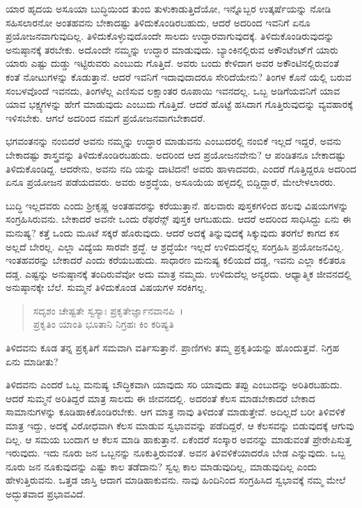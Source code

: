 ಯಾರ ಹೃದಯ ಅಸೂಯಾ ಬುದ್ಧಿಯಿಂದ ತುಂಬಿ ತುಳುಕಾಡುತ್ತಿದೆಯೋ, ಇನ್ನೊಬ್ಬರ ಉತ್ಕರ್ಷೆಯನ್ನು ನೋಡಿ ಸಹಿಸಲಾರನೋ ಅಂತಹವನು ಬೇಕಾದಷ್ಟು ತಿಳಿದುಕೊಂಡಿರಬಹುದು, ಆದರೆ ಅದರಿಂದ ಇವನಿಗೆ ಏನೂ ಪ್ರಯೋಜನವಾಗುವುದಿಲ್ಲ. ತಿಳಿದುಕೊಳ್ಳುವುದೊಂದೇ ಸಾಲದು ಉದ್ಧಾರವಾಗುವುದಕ್ಕೆ. ತಿಳಿದುಕೊಂಡಿರುವುದನ್ನು ಅನುಷ್ಠಾನಕ್ಕೆ ತರಬೇಕು. ಅದೊಂದೇ ನಮ್ಮನ್ನು ಉದ್ಧಾರ ಮಾಡುವುದು. ಬ್ಯಾಂಕಿನಲ್ಲಿರುವ ಅಕೌಂಟೆಂಟ್​ಗೆ ಯಾರು ಯಾರು ಎಷ್ಟು ದುಡ್ಡು ಇಟ್ಟಿರುವರು ಎಂಬುದು ಗೊತ್ತಿದೆ. ಅವರು ಬಂದು ಕೇಳಿದಾಗ ಅವರ ಅಕೌಂಟಿನಲ್ಲಿರುವಂತೆ ಕಂತೆ ನೋಟುಗಳನ್ನು ಕೊಡುತ್ತಾನೆ. ಆದರೆ ಇವನಿಗೆ ಇದಾವುದಾದರೂ ಸೇರಿದೆಯೇನು? ತಿಂಗಳ ಕೊನೆ ಯಲ್ಲಿ ಬರುವ ಸಂಬಳವೊಂದೆ ಇವನದು, ತಿಂಗಳೆಲ್ಲ ಎಣಿಸುವ ಲಕ್ಷಾಂತರ ರೂಪಾಯಿ ಇವನದಲ್ಲ. ಒಬ್ಬ ಅಡಿಗೆಯವನಿಗೆ ಯಾವ ಯಾವ ಭಕ್ಷ್ಯಗಳನ್ನು ಹೇಗೆ ಮಾಡುವುದು ಎಂಬುದು ಗೊತ್ತಿದೆ. ಆದರೆ ಹೊಟ್ಟೆ ಹಸಿದಾಗ ಗೊತ್ತಿರುವುದನ್ನು ವ್ಯವಹಾರಕ್ಕೆ ಇಳಿಸಬೇಕು. ಆಗಲೆ ಅದರಿಂದ ನಮಗೆ ಪ್ರಯೋಜನವಾಗಬೇಕಾದರೆ.

ಭಗವಂತನನ್ನು ನಂಬಿದರೆ ಅವನು ನಮ್ಮನ್ನು ಉದ್ಧಾರ ಮಾಡುವನು ಎಂಬುದರಲ್ಲಿ ನಂಬಿಕೆ ಇಲ್ಲದೆ ಇದ್ದರೆ, ಅವನು ಬೇಕಾದಷ್ಟು ಶಾಸ್ತ್ರವನ್ನು ತಿಳಿದುಕೊಂಡಿರಬಹುದು. ಅದರಿಂದ ಆದ ಪ್ರಯೋಜನವೇನು? ಆ ಪಂಡಿತನೂ ಬೇಕಾದಷ್ಟು ತಿಳಿದುಕೊಂಡಿದ್ದ. ಆದರೇನು, ಅವನು ನದಿ ಯನ್ನು ದಾಟಿದನೆ! ಅವರು ಹಾಳಾದವರು, ಎಂದರೆ ಗೊತ್ತಿದ್ದರೂ ಅದರಿಂದ ಏನೂ ಪ್ರಯೋಜನ ಪಡೆಯದವರು. ಅವರು ಅಶ್ರದ್ಧೆಯ, ಅಸೂಯೆಯ ಹಳ್ಳದಲ್ಲಿ ಬಿದ್ದಿದ್ದಾರೆ, ಮೇಲೇಳಲಾರರು.

ಬುದ್ಧಿ ಇಲ್ಲದವರು ಎಂದು ಶ‍್ರೀಕೃಷ್ಣ ಅಂತಹವರನ್ನು ಕರೆಯುತ್ತಾನೆ. ಹಲವಾರು ಪುಸ್ತಕಗಳಿಂದ ಹಲವು ವಿಷಯಗಳನ್ನು ಸಂಗ್ರಹಿಸಿರುವನು. ಬೇಕಾದರೆ ಅವನೇ ಒಂದು ರೆಫರೆನ್ಸ್ ಪುಸ್ತಕ ಆಗಬಹುದು. ಆದರೆ ಅದರಿಂದ ಸಾಧಿಸಿದ್ದು ಏನು ಈ ಮನುಷ್ಯ? ಕತ್ತೆ ಒಂದು ಮೂಟೆ ಸಕ್ಕರೆ ಹೊರುವುದು. ಆದರೆ ಅದಕ್ಕೆ ತಿನ್ನುವುದಕ್ಕೆ ಸಿಕ್ಕುವುದು ತರಗೆಲೆ ಕಾಗದ ಕಸ ಅಲ್ಲದೆ ಬೇರಲ್ಲ. ಎಲ್ಲಾ ವಿದ್ಯೆಯ ಸಾರವೇ ಶ್ರದ್ಧೆ. ಆ ಶ್ರದ್ಧೆಯೇ ಇಲ್ಲದೆ ಉಳಿದುದನ್ನೆಲ್ಲ ಸಂಗ್ರಹಿಸಿ ಪ್ರಯೋಜನವಿಲ್ಲ. ಇಂತಹವರನ್ನು ಬೇಕಾದರೆ  ಎಂದು ಕರೆಯಬಹುದು. ಸಾಧಾರಣ ಮನುಷ್ಯ ಕಲಿಯದೆ ದಡ್ಡ, ಇವನು ಎಲ್ಲಾ ಕಲಿತರೂ ದಡ್ಡ. ಎಷ್ಟನ್ನು ಅನುಷ್ಠಾನಕ್ಕೆ ತಂದಿರುವೆವೋ ಅದು ಮಾತ್ರ ನಮ್ಮದು. ಉಳಿದುದೆಲ್ಲ ಅನ್ಯರದು. ಆಧ್ಯಾತ್ಮಿಕ ಜೀವನದಲ್ಲಿ ಅನುಷ್ಠಾನಕ್ಕೇ ಬೆಲೆ. ಸುಮ್ಮನೆ ತಿಳಿದುಕೊಂಡ ವಿಷಯಗಳ ಸರಕಿಗಲ್ಲ.

\begin{verse}
ಸದೃಶಂ ಚೇಷ್ಟತೇ ಸ್ವಸ್ಯಾಃ ಪ್ರಕೃತೇರ್ಜ್ಞಾನವಾನಪಿ~।\\ಪ್ರಕೃತಿಂ ಯಾಂತಿ ಭೂತಾನಿ ನಿಗ್ರಹಃ ಕಿಂ ಕರಿಷ್ಯತಿ 
\end{verse}

{\small ತಿಳಿದವನು ಕೂಡ ತನ್ನ ಪ್ರಕೃತಿಗೆ ಸಮವಾಗಿ ವರ್ತಿಸುತ್ತಾನೆ. ಪ್ರಾಣಿಗಳು ತಮ್ಮ ಪ್ರಕೃತಿಯನ್ನು ಹೊಂದುತ್ತವೆ. ನಿಗ್ರಹ ಏನು ಮಾಡೀತು?}

ತಿಳಿದವನು ಎಂದರೆ ಒಬ್ಬ ಮನುಷ್ಯ ಬೌದ್ಧಿಕವಾಗಿ ಯಾವುದು ಸರಿ ಯಾವುದು ತಪ್ಪು ಎಂಬುದನ್ನು ಅರಿತಿರಬಹುದು. ಆದರೆ ಸುಮ್ಮನೆ ಅರಿತಿದ್ದರೆ ಮಾತ್ರ ಸಾಲದು ಈ ಜೀವನದಲ್ಲಿ. ಅದರಂತೆ ಕೆಲಸ ಮಾಡಬೇಕಾದರೆ ಬೇಕಾದ ಸಾಮಾನುಗಳನ್ನು ಕೂಡಿಹಾಕಿಕೊಂಡಿರಬೇಕು. ಆಗ ಮಾತ್ರ ನಾವು ತಿಳಿದಂತೆ ಮಾಡುತ್ತೇವೆ. ಅದಿಲ್ಲದೆ ಬರೀ ತಿಳಿವಳಿಕೆ ಮಾತ್ರ ಇದ್ದು, ಅದಕ್ಕೆ ವಿರೋಧವಾಗಿ ಕೆಲಸ ಮಾಡುವ ಸ್ವಭಾವವನ್ನು ಪಡೆದಿದ್ದರೆ, ಆ ಕೆಲಸವನ್ನು ಬಿಡುವುದಕ್ಕೆ ಆಗುವು ದಿಲ್ಲ. ಆ ಸಮಯ ಬಂದಾಗ ಆ ಕೆಲಸ ಮಾಡಿ ಹಾಕುತ್ತಾನೆ. ಏಕೆಂದರೆ ಸಂಸ್ಕಾರ ಅವನನ್ನು ಮಾಡುವಂತೆ ಪ್ರೇರೇಪಿಸುತ್ತ ಇರುವುದು. ಇದು ನೂರು ಜನ ಒಬ್ಬನನ್ನು ನೂಕುತ್ತಿರುವಂತೆ. ಅವನ ತಿಳಿವಳಿಕೆಯಾದರೊ ಬೇಡ ಎನ್ನುವುದು. ಒಬ್ಬ ನೂರು ಜನ ನೂಕುವುದನ್ನು ಎಷ್ಟು ಕಾಲ ತಡೆದಾನು? ಸ್ವಲ್ಪ ಕಾಲ ಮಾಡುವುದಿಲ್ಲ, ಮಾಡುವುದಿಲ್ಲ ಎಂದು ಹೇಳುತ್ತಿರುವನು. ಒತ್ತಡ ಜಾಸ್ತಿ ಆದಾಗ ಮಾಡಿಹಾಕುವನು. ನಾವು ಹಿಂದಿನಿಂದ ಸಂಗ್ರಹಿಸಿದ ಸ್ವಭಾವಕ್ಕೆ ನಮ್ಮ ಮೇಲೆ ಅದ್ಭುತವಾದ ಪ್ರಭಾವವಿದೆ.

